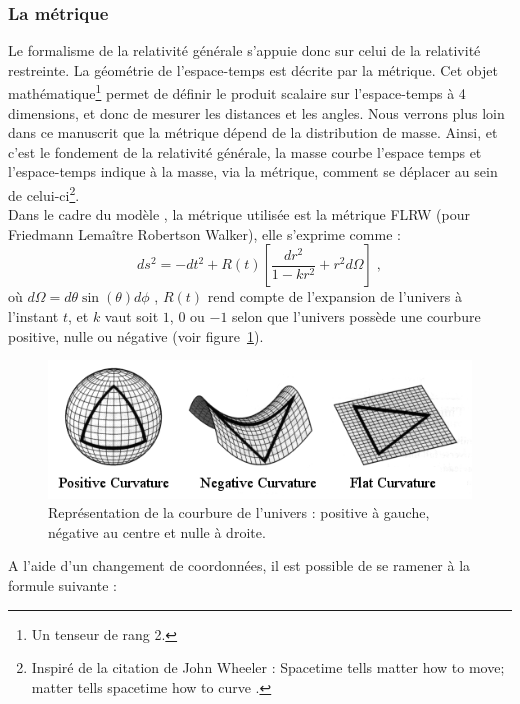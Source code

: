 \subsubsection{La métrique}
Le formalisme de la relativité générale s'appuie donc sur celui de la relativité restreinte. La géométrie de l'espace-temps est décrite par la métrique. Cet objet mathématique\footnote{Un tenseur de rang 2.} permet de définir le produit scalaire sur l'espace-temps à 4 dimensions, et donc de mesurer les distances et les angles.
Nous verrons plus loin dans ce manuscrit que la métrique dépend de la distribution de masse. Ainsi, et c'est le fondement de la relativité générale, la masse courbe l'espace temps et l'espace-temps indique à la masse, via la métrique, comment se déplacer au sein de celui-ci\footnote{Inspiré de la citation de John Wheeler : \og Spacetime tells matter how to move; matter tells spacetime how to curve \fg.}. \\
Dans le cadre du modèle \lcdm{}, la métrique utilisée est la métrique FLRW (pour Friedmann Lemaître Robertson Walker), elle s'exprime comme :
\begin{equation}
  \label{eq:metrique1}
  ds^2 = - dt^2 + R(t) \left[ \frac{dr^2}{1 - k r^2} + r^2 d\Omega \right] \; ,
\end{equation}
où $d\Omega = d\theta \sin(\theta) d\phi$ , $R(t)$ rend compte de l'expansion de l'univers à l'instant $t$, et $k$ vaut soit $1$, $0$ ou $-1$ selon que l'univers possède une courbure positive, nulle ou négative (voir figure~\ref{fig:curvature}).
\begin{figure}
  \centering
  \includegraphics[scale=0.6]{curvature}
  \caption{Représentation de la courbure de l'univers : positive à gauche, négative au centre et nulle à droite.}
  \label{fig:curvature}
\end{figure}
A l'aide d'un changement de coordonnées, il est possible de se ramener à la formule suivante :

